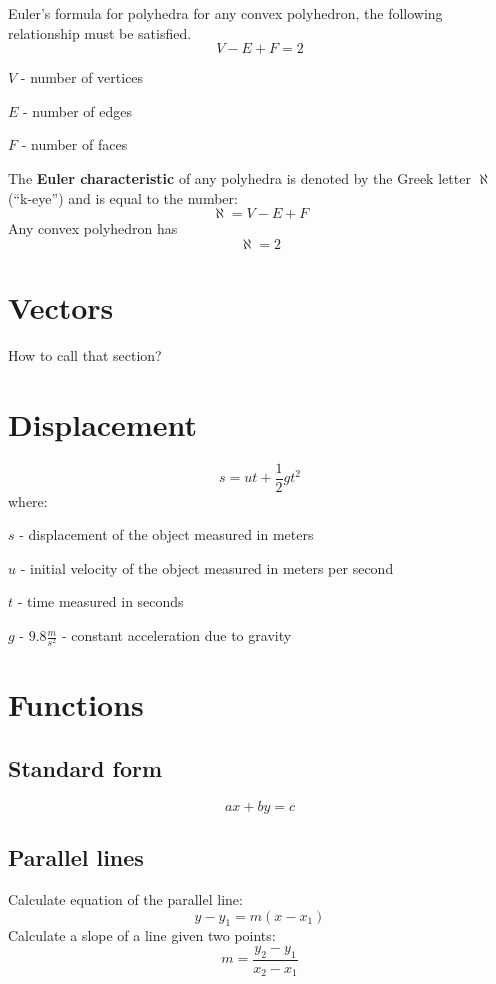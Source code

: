 \documentclass{article}
\begin{document}
Euler's formula for polyhedra for any convex polyhedron, the following
relationship must be satisfied.
\begin{equation}
  V - E + F = 2
\end{equation}

$V$ - number of vertices

$E$ - number of edges

$F$ - number of faces

The \textbf{Euler characteristic} of any polyhedra is denoted by the
Greek letter $\aleph$ (``k-eye'') and is equal to the number:
\begin{equation}
  \aleph = V - E + F
\end{equation}
Any convex polyhedron has
\begin{equation}
  \aleph = 2
\end{equation}
\section{Vectors}
How to call that section?
\section{Displacement}
\begin{equation}
  s = ut+\frac{1}{2}gt^2
\end{equation}
where:

$s$ - displacement of the object measured in meters

$u$ - initial velocity of the object measured in meters per second

$t$ - time measured in seconds

$g$ - $9.8\frac{m}{s^2}$ - constant acceleration due to gravity
\section{Functions}
\subsection{Standard form}
\begin{equation}
  ax + by = c
\end{equation}
\subsection{Parallel lines}
Calculate equation of the parallel line:
\begin{equation}
  y - y_1 = m(x - x_1)
\end{equation}
Calculate a slope of a line given two points:
\begin{equation}
  m = \frac{y_2 - y_1}{x_2 - x_1}
\end{equation}
\end{document}
